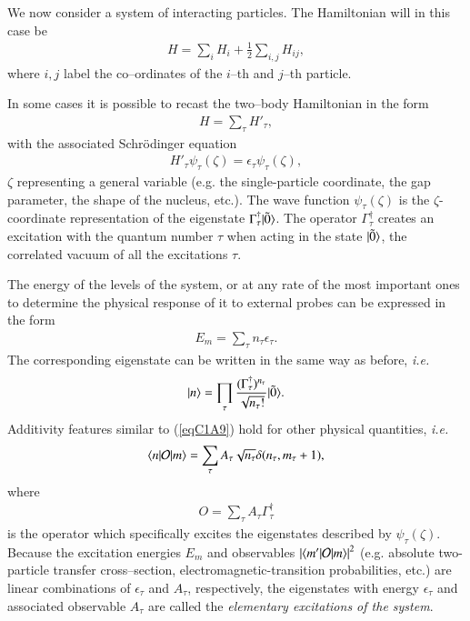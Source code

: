 We now  consider a system of interacting particles. The Hamiltonian will in this case be
\begin{align}\label{eqC1A6}
H=\sum_i H_i+\frac{1}{2}\sum_{i,j}H_{ij},
\end{align}
where $i,j$ label the co--ordinates of the $i$--th and $j$--th particle.

In some cases it is possible to recast the two--body Hamiltonian in the form
\begin{align}\label{eqC1A7}
H=\sum_\tau H'_\tau,
\end{align}
with the associated Schr\"odinger equation
\begin{align}\label{eqC1A8}
H'_\tau\psi_\tau(\zeta)=\epsilon_\tau \psi_\tau(\zeta),
\end{align}
$\zeta$ representing a general variable (e.g. the single-particle coordinate, the gap parameter, the shape of the nucleus, etc.). The wave function $\psi_\tau(\zeta)$ is the $\zeta$-coordinate representation of the eigenstate $\Gamma_\tau^\dagger|{\tilde 0} \rangle$. The operator $\Gamma_\tau^\dagger$ creates an excitation with the quantum number $\tau$ when acting in the state $|{\tilde 0} \rangle$, the correlated vacuum of all the excitations $\tau$.



The energy of the levels of the system, or at any rate of the most important
ones to determine the physical response of it to external probes can be expressed
in the form
\begin{align}\label{eqC1A9}
E_m=\sum_{\tau}n_\tau \epsilon_\tau.
\end{align}
The corresponding eigenstate can be written in the same way as before, \textit{i.e.}
\begin{align}\label{eqC1A10}
|{n} \rangle=\prod_\tau\frac{(\Gamma_\tau^\dagger)^{n_\tau}}{\sqrt{n_\tau!}}|{\tilde 0} \rangle.
\end{align}
Additivity features similar to (\ref{eqC1A9}) hold for other physical quantities, \textit{i.e.}
\begin{align}\label{eqC1A11}
\langle {n|\mathcal O|m} \rangle=\sum_{\tau}A_\tau\sqrt{n_\tau} \delta(n_\tau,m_\tau+1),
\end{align}
where
\begin{align}\label{eqC1A12} O=\sum_{\tau}A_\tau \Gamma_\tau^\dagger
\end{align}
is the operator which specifically excites the eigenstates described by $\psi_\tau(\zeta)$.
Because the excitation energies $E_m$ and observables $\left|\langle {m'|\mathcal O|m} \rangle\right|^2$ (e.g. absolute two-particle transfer cross--section, electromagnetic-transition probabilities, etc.) are
linear combinations of $\epsilon_\tau$ and $A_\tau$, respectively, the eigenstates with energy $\epsilon_\tau$
and associated observable $A_\tau$ are called the \textit{elementary excitations of the system}.


